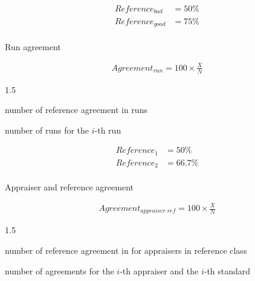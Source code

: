 \documentclass[
  a4paper,
]{scrbook}
\makeatletter
\let\oldparagraph\paragraph
\renewcommand{\paragraph}{
    \@ifstar
      \xxxParagraphStar
      \xxxParagraphNoStar
  }
\newcommand{\xxxParagraphStar}[1]{\oldparagraph*{#1}\mbox{}}
\newcommand{\xxxParagraphNoStar}[1]{\oldparagraph{#1}\mbox{}}
\providecommand{\tightlist}{%
  \setlength{\itemsep}{0pt}\setlength{\parskip}{0pt}}\usepackage{longtable,booktabs,array}
\let\olddescription\description
\let\endolddescription\enddescription
\renewenvironment{description}{
          \begin{spacing}{1.5}\olddescription
        }{
          \endolddescription\end{spacing}
        }
\makeatother
\begin{document}
\begin{align}
Reference_{bad} &= 50\% \nonumber \\
Reference_{good} &= 75\% \nonumber
\end{align}

\paragraph{Run agreement}\label{run-agreement}

\begin{align}
Agreement_{run} = 100 \times \frac{X}{N}
\end{align}

\begin{description}
\tightlist
\item[\(X\)]
number of reference agreement in runs
\item[\(N_i\)]
number of runs for the \(i\)-th run
\end{description}

\begin{align}
Reference_{1} &= 50\% \nonumber \\
Reference_{2} &= 66.7\% \nonumber
\end{align}

\paragraph{Appraiser and reference
agreement}\label{appraiser-and-reference-agreement}

\begin{align}
Agreement_{appraiser \; ref} = 100 \times \frac{X}{N}
\end{align}

\begin{description}
\tightlist
\item[\(X\)]
number of reference agreement in for appraisers in reference class
\item[\(N_i\)]
number of agreements for the \(i\)-th appraiser and the \(i\)-th
standard
\end{description}

\begin{table}

\caption{\label{tbl-app-ref-agree}}


\end{table}%
\end{document}
